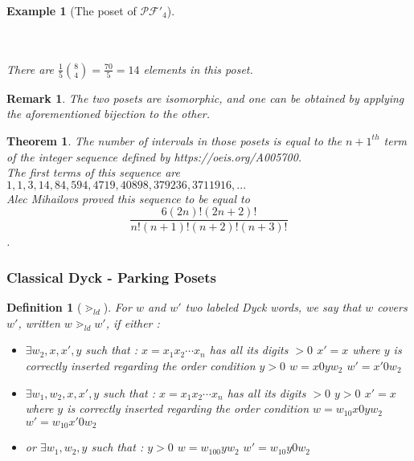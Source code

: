 \documentclass[12pt]{report}
\newtheorem{theorem}{Theorem}
\newtheorem{definition}{Definition}
\newtheorem*{example}{Example}
\newtheorem*{rem}{Remark}
\begin{document}
\begin{example}[The poset of $\mathcal{PF'}_4$]
\begin{center}
\begin{tikzpicture}[scale = 0.3]
        \end{tikzpicture}
        ~\\
        ~\\
        There are $\frac {1}{5} \binom{8}{4} = \frac{70}{5} = 14$
        elements in this poset.
    \end{center}
\end{example}

\begin{rem}
    The two posets are isomorphic, and one can be obtained by
    applying the aforementioned bijection to the other.
\end{rem}

\begin{theorem}
    The number of intervals in those posets is equal to
    the $n+1^{th}$ term of the integer sequence defined by
    https://oeis.org/A005700.\\
    The first terms of this sequence are $1, 1, 3, 14, 84,
    594, 4719, 40898, 379236, 3711916, ...$\\
    Alec Mihailovs proved this sequence to be equal to
    $$\frac {6 (2n)! (2n+2)!}{n!(n+1)!(n+2)!(n+3)!}$$.
\end{theorem}

\subsubsection{Classical Dyck - Parking Posets}

\begin{definition}[$\gtrdot_{ld}$]
    For $w$ and $w'$ two labeled Dyck words, we say
    that $w$ covers $w'$, written $w \gtrdot_{ld} w'$,
    if either :
    \begin{itemize}
        \item $\exists w_2, x, x', y$ such that :
            \subitem $x = x_1x_2 \cdots x_n$ has all 
            its digits $> 0$
            \subitem $x' = x$ where $y$ is correctly
            inserted regarding the order condition
            \subitem $y > 0$
            \subitem $w = x0yw_2$
            \subitem $w' = x'0w_2$
        \item $\exists w_1, w_2, x, x', y$ such that :
            \subitem $x = x_1x_2 \cdots x_n$ has all 
                its digits $> 0$
            \subitem $y > 0$
            \subitem $x' = x$ where $y$ is correctly
                inserted regarding the order condition
            \subitem $w = w_10x0yw_2$
            \subitem $w' = w_10x'0w_2$
        \item or $\exists w_1, w_2, y$ such that :
            \subitem $y > 0$
            \subitem $w = w_100yw_2$
            \subitem $w' = w_10y0w_2$
    \end{itemize}  
\end{definition}
\end{document}
